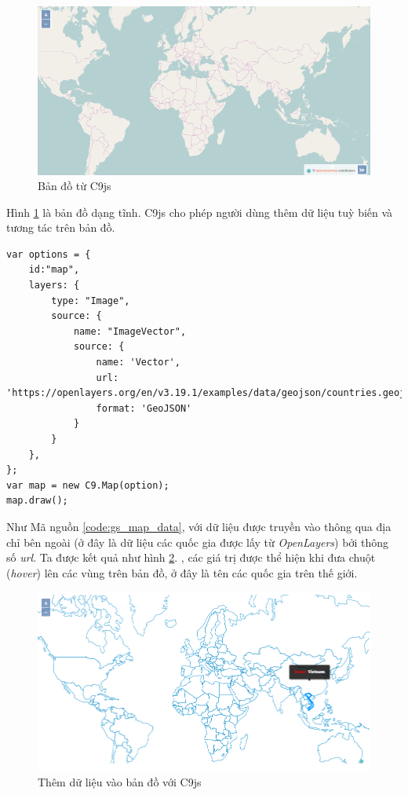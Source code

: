 \documentclass[12pt,a4paper]{article}
\begin{document}
\begin{figure}[htp]
	\begin{center}
    \includegraphics[scale=.7]{image/gs_3}
    \caption{Bản đồ từ C9js}
    \label{fig:gs_3}
	\end{center}
\end{figure}

Hình \ref{fig:gs_3} là bản đồ dạng tĩnh. C9js cho phép người dùng thêm dữ liệu tuỳ biến và tương tác trên bản đồ.

\begin{lstlisting}[caption=Thêm dữ liệu vào Bản đồ với C9js, label={code:gs_map_data}]
var options = {  
    id:"map",
    layers: {
        type: "Image",
        source: {
            name: "ImageVector",
            source: {
                name: 'Vector',
                url: 'https://openlayers.org/en/v3.19.1/examples/data/geojson/countries.geojson',
                format: 'GeoJSON'   
            }
        }
    },
};
var map = new C9.Map(option);
map.draw();
\end{lstlisting}

Như Mã nguồn \ref{code:gs_map_data}, với dữ liệu được truyền vào thông qua địa chỉ bên ngoài (ở đây là dữ liệu các quốc gia được lấy từ \textit{OpenLayers}) bởi thông số \textit{url}. Ta được kết quả như hình \ref{fig:gs_4}. , các giá trị được thể hiện khi đưa chuột (\textit{hover}) lên các vùng trên bản đồ, ở đây là tên các quốc gia trên thế giới.

\begin{figure}[htp]
	\begin{center}
    \includegraphics[scale=.7]{image/gs_4}
    \caption{Thêm dữ liệu vào bản đồ với C9js}
    \label{fig:gs_4}
	\end{center}
\end{figure}
\end{document}
